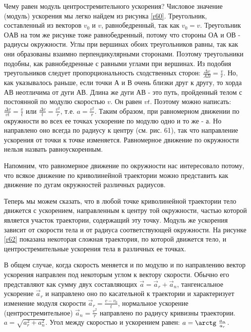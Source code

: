 \documentclass[a6paper, 11pt]{diss_4}
\renewcommand{\'}{\,'}
\begin{document}
  Чему равен модуль центростремительного ускорения? Числовое значение
(модуль) ускорения мы легко найдем из рисунка \ref{r60}. Треугольник, составленный из
 векторов $v_0$ и $v$, равнобедренный, так как $v_0=v$. Треугольник $ОАВ$ на
том же рисунке тоже равнобедренный, потому что стороны $ОА$ и $ОВ$ - радиусы
окружности. Углы при вершинах обоих треугольников равны, так как они
образованы взаимно перпендикулярными сторонами. Поэтому треугольники подобны,
как равнобедренные с равными углами при вершинах. Из подобия треугольников
следует пропорциональность сходственных сторон: $\frac{\Delta
v}{AB}=\frac{v}{r}$. Но, как указывалось раньше, если точки $А$ и $В$ очень
близки друг к другу, то хорда $АВ$ неотличима от дуги $АВ$. Длина же дуги $АВ$ -
 это путь, пройденный телом с постоянной по модулю скоростью $v$. Он равен
$vt$. Поэтому можно написать: $\frac{\Delta v}{vt}=\frac{v}{t}$ или
$\frac{\Delta v}{t}=\frac{v^2}{r}$, т.е. $a=\frac{v^2}{r}$. Таким образом, при
равномерном движении по окружности во всех ее точках ускорение по модулю одно
и то же - $а$. Но направлено оно всегда по радиусу к центру (см. рис. 61), так
что направление ускорения от точки к точке изменяется. Равномерное движение
по окружности нельзя назвать равноускоренным.

  Напомним, что равномерное движение по окружности нас интересовало
потому, что всякое движение по криволинейной траектории можно представить как
движение по дугам окружностей различных радиусов.

  Теперь мы можем сказать, что в любой точке криволинейной траектории
тело движется с ускорением, направленным к центру той окружности, частью
которой является участок траектории, содержащий эту точку. Модуль же ускорения
зависит от скорости тела и от радиуса соответствующей окружности. На рисунке \ref{r62}
показана некоторая сложная траектория, по которой движется тело, и
центростремительные ускорения тела в различных ее точках.

  В общем случае, когда скорость меняется и по модулю и по направлению вектор
ускорения направлен под некоторым углом к вектору скорости. Обычно его
представляют как сумму двух составляющих $\vec{a}=\vec{a}_r+\vec{a}_n$,
тангенсальное ускорение $\vec{a}_r$ и направлено оно по касательной к
траектории и характеризует изменение модуля скорости $\vec{a}_r=\frac{v-
v_0}{t}$, нормальное ускорение (центростремительное) $\vec{a}_n=\frac{v^2}{r}$
 направлено по радиусу кривизны траектории. $a=\sqrt{a^2_r+a^2_n}$. Угол между
скоростью и ускорением равен: $a=\arctg\ \frac{a_n}{a_r}$.
\end{document}
